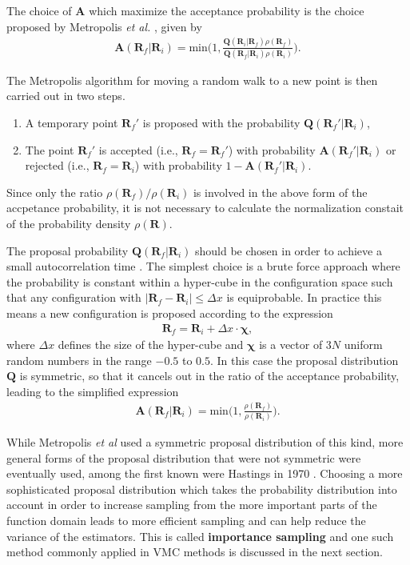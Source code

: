 \documentclass[twoside,english]{uiofysmaster}
\begin{document}
The choice of $\bm{A}$ which maximize the acceptance probability is the choice proposed by Metropolis \textit{et al.} \cite{Metropolis1953}, given by
\begin{align}
	\bm{A} (\bm{R}_f | \bm{R}_i) = \text{min} \Big (1,    
	\frac{\bm{Q} (\bm{R}_i | \bm{R}_f) \rho (\bm{R}_f)}
	{\bm{Q} (\bm{R}_f | \bm{R}_i) \rho (\bm{R}_i)}
	\Big) .
\end{align}

The Metropolis algorithm for moving a random walk to a new point is then carried out in two steps.
\begin{enumerate}
	\item A temporary point $\bm{R}_f'$ is proposed with the probability $\bm{Q} (\bm{R}_f' | \bm{R}_i)$,
	\item The point $\bm{R}_f'$ is accepted (i.e., $\bm{R}_f = \bm{R}_f'$) with probability $\bm{A} (\bm{R}_f' | \bm{R}_i)$ or rejected (i.e., $\bm{R}_f = \bm{R}_i$) with probability $1 - \bm{A} (\bm{R}_f' | \bm{R}_i)$.
\end{enumerate}

Since only the ratio $\rho (\bm{R}_f)/\rho (\bm{R}_i)$ is involved in the
above form of the accpetance probability, it is not necessary to
calculate the normalization constait of the probability density $\rho
(\bm{R})$. 

The proposal
probability $\bm{Q} (\bm{R}_f| \bm{R}_i)$ should be chosen in order to achieve a small
autocorrelation time \cite{Toulouse2016}. The simplest choice is a brute force approach where the probability is constant within a hyper-cube in the configuration space such that any configuration with $|\bm{R}_f - \bm{R}_i| \leq \Delta x$ is equiprobable. In practice this means a new configuration is proposed according to the expression
\begin{align}
	\bm{R}_f = \bm{R}_i + \Delta x \cdot \bm{\chi},
\end{align}
where $\Delta x$ defines the size of the hyper-cube and $\bm{\chi}$ is a vector of $3N$ uniform random numbers in the range $-0.5$ to $0.5$. 
In this case the proposal distribution $\bm{Q}$ is symmetric, so that it cancels out in the ratio of the acceptance probability, leading to the simplified expression
\begin{align}
	\bm{A} (\bm{R}_f | \bm{R}_i) = \text{min} \Big (1,    
	\frac{ \rho (\bm{R}_f)}{ \rho (\bm{R}_i)}
	\Big) .
\end{align}

While Metropolis \textit{et al} used a symmetric proposal distribution of this kind, more general forms of the proposal distribution that were not symmetric were eventually used, among the first known were Hastings in 1970 \cite{Hastings1970}. 
Choosing a more sophisticated proposal distribution which takes the probability distribution into account in order to increase sampling from the more important parts of the function domain leads to more efficient sampling and can help reduce the variance of the estimators. This is called \textbf{importance sampling} and one such method commonly applied in VMC methods is discussed in the next section.
\end{document}
